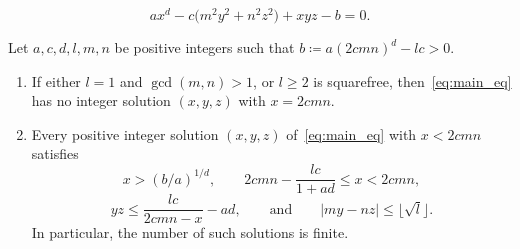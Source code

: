 \documentclass[10pt,a4paper]{amsart}
\begin{document}
\begin{equation}\label{eq:main_eq}
  ax^{d} - c\bigl(m^{2}y^{2} + n^{2}z^{2}\bigr) + xyz - b = 0.
\end{equation}

\begin{theorem}\label{positive solutions bound}
Let $a, c, d, l, m, n$ be positive integers such that $b \coloneqq a(2cmn)^{d} - lc > 0$.
\begin{enumerate}[label=(\alph*)]
    \item If either $l = 1$ and $\gcd(m,n) > 1$, or $l \ge 2$ is squarefree, then~\eqref{eq:main_eq} has no integer solution $(x,y,z)$ with $x = 2cmn$.
    \item Every positive integer solution $(x,y,z)$ of~\eqref{eq:main_eq} with $x < 2cmn$ satisfies
    \[
    x > (b/a)^{1/d}, \qquad 2cmn - \frac{lc}{1+ad} \le x < 2cmn,
    \]
    \[
    yz \le \frac{lc}{2cmn - x} - ad, \qquad \text{and} \qquad |my - nz| \le \big\lfloor \sqrt{l} \big\rfloor.
    \]
    In particular, the number of such solutions is finite.
\end{enumerate}
\end{theorem}
\end{document}

